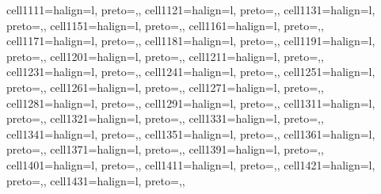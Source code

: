 \begin{table}
\begin{talltblr}
{cell{111}{1}={}{halign=l, preto={\hspace{1em}},},
cell{112}{1}={}{halign=l, preto={\hspace{1em}},},
cell{113}{1}={}{halign=l, preto={\hspace{1em}},},
cell{115}{1}={}{halign=l, preto={\hspace{1em}},},
cell{116}{1}={}{halign=l, preto={\hspace{1em}},},
cell{117}{1}={}{halign=l, preto={\hspace{1em}},},
cell{118}{1}={}{halign=l, preto={\hspace{1em}},},
cell{119}{1}={}{halign=l, preto={\hspace{1em}},},
cell{120}{1}={}{halign=l, preto={\hspace{1em}},},
cell{121}{1}={}{halign=l, preto={\hspace{1em}},},
cell{123}{1}={}{halign=l, preto={\hspace{1em}},},
cell{124}{1}={}{halign=l, preto={\hspace{1em}},},
cell{125}{1}={}{halign=l, preto={\hspace{1em}},},
cell{126}{1}={}{halign=l, preto={\hspace{1em}},},
cell{127}{1}={}{halign=l, preto={\hspace{1em}},},
cell{128}{1}={}{halign=l, preto={\hspace{1em}},},
cell{129}{1}={}{halign=l, preto={\hspace{1em}},},
cell{131}{1}={}{halign=l, preto={\hspace{1em}},},
cell{132}{1}={}{halign=l, preto={\hspace{1em}},},
cell{133}{1}={}{halign=l, preto={\hspace{1em}},},
cell{134}{1}={}{halign=l, preto={\hspace{1em}},},
cell{135}{1}={}{halign=l, preto={\hspace{1em}},},
cell{136}{1}={}{halign=l, preto={\hspace{1em}},},
cell{137}{1}={}{halign=l, preto={\hspace{1em}},},
cell{139}{1}={}{halign=l, preto={\hspace{1em}},},
cell{140}{1}={}{halign=l, preto={\hspace{1em}},},
cell{141}{1}={}{halign=l, preto={\hspace{1em}},},
cell{142}{1}={}{halign=l, preto={\hspace{1em}},},
cell{143}{1}={}{halign=l, preto={\hspace{1em}},},
}
\end{talltblr}
\end{table}

